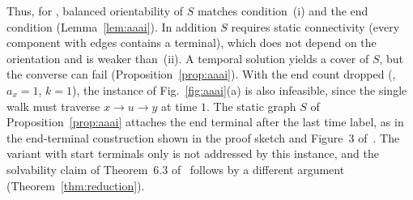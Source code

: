 Thus, for \FIX{}, balanced orientability of $S$ matches condition~(i) and the end condition (Lemma~\ref{lem:aaai}). In addition $S$ requires static connectivity (every component with edges contains a terminal), which does not depend on the orientation and is weaker than~(ii). A temporal solution yields a cover of $S$, but the converse can fail (Proposition~\ref{prop:aaai}). With the end count dropped (\FREE{}, $a_x=1$, $k=1$), the instance of Fig.~\ref{fig:aaai}(a) is also infeasible, since the single walk must traverse $x\to u\to y$ at time $1$. The static graph $S$ of Proposition~\ref{prop:aaai} attaches the end terminal after the last time label, as in the end-terminal construction shown in the proof sketch and Figure~3 of~\cite{deligkas2025}. The variant with start terminals only is not addressed by this instance, and the solvability claim of Theorem~6.3 of~\cite{deligkas2025} follows by a different argument (Theorem~\ref{thm:reduction}).
